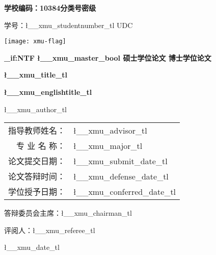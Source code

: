 \ExplSyntaxOn
\begin{center}
	{
		\vspace*{-4ex}
		\raggedright\rmfamily\bfseries{}
		学校编码：10384\qquad 分类号\quad 密级 \par 
		学号：\l__xmu_studentnumber_tl \qquad UDC\;\par\vspace{5ex}
		\centering\texttt{[image: xmu-flag]}\par\vspace{4ex}
	}
	{
		\rmfamily\bfseries{}
		\bool_if:NTF \l__xmu_master_bool{
			硕\quad 士\quad 学\quad 位\quad 论\quad 文
			}{
			博\quad 士\quad 学\quad 位\quad 论\quad 文
		}
		\par\vspace{3ex}
	}
	{
		\sffamily\bfseries{}\l__xmu_title_tl\par\vspace{2ex}
	}
	{
		\rmfamily\bfseries{}\l__xmu_englishtitle_tl\par\vspace{2ex}
	}
	{
		\ttfamily{}\l__xmu_author_tl\par\vspace{2ex}
	}
	{
		\ttfamily{}
		\begin{tabular}{rl} 
			指导教师姓名：& \l__xmu_advisor_tl \\
			专\hspace{0.66\ccwd} 业\hspace{0.66\ccwd} 名\hspace{0.66\ccwd} 称：& \l__xmu_major_tl \\
			论文提交日期：& \l__xmu_submit_date_tl\\
			论文答辩时间：& \l__xmu_defense_date_tl\\
			学位授予日期：& \l__xmu_conferred_date_tl\\   
		\end{tabular}%
		\par\vspace{1cm}
	}
	{
		答辩委员会主席：\l__xmu_chairman_tl\par
		评阅人：\l__xmu_referee_tl\par 
		\l__xmu_date_tl\par 
	}
\end{center}

\ExplSyntaxOff